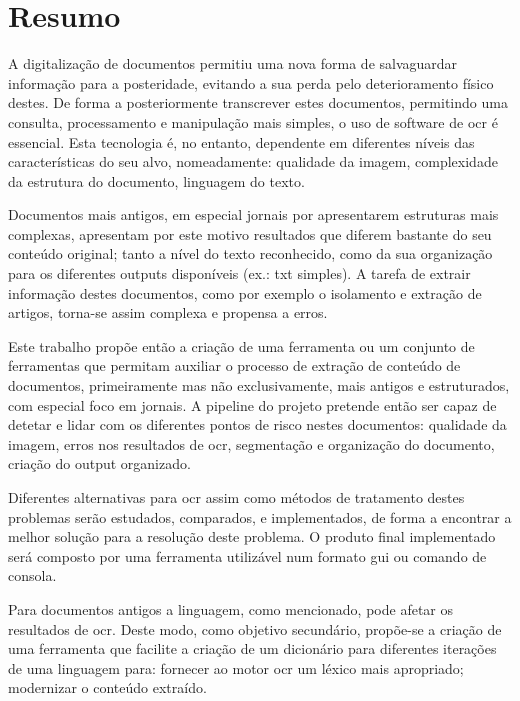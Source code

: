 \chapter*{Resumo}


A digitalização de documentos permitiu uma nova forma de salvaguardar informação para a posteridade, evitando a sua perda pelo deterioramento físico destes. De forma a posteriormente transcrever estes documentos, permitindo uma consulta, processamento e manipulação mais simples, o uso de software de \acrshort{ocr} é essencial. Esta tecnologia é, no entanto, dependente em diferentes níveis das características do seu alvo, nomeadamente: qualidade da imagem, complexidade da estrutura do documento, linguagem do texto. 

Documentos mais antigos, em especial jornais por apresentarem estruturas mais complexas, apresentam por este motivo resultados que diferem bastante do seu conteúdo original; tanto a nível do texto reconhecido, como da sua organização para os diferentes outputs disponíveis (ex.: txt simples). A tarefa de extrair informação destes documentos, como por exemplo o isolamento e extração de artigos, torna-se assim complexa e propensa a erros. 

Este trabalho propõe então a criação de uma ferramenta ou um conjunto de ferramentas que permitam auxiliar o processo de extração de conteúdo de documentos, primeiramente mas não exclusivamente, mais antigos e estruturados, com especial foco em jornais. A pipeline do projeto pretende então ser capaz de detetar e lidar com os diferentes pontos de risco nestes documentos: qualidade da imagem, erros nos resultados de \acrshort{ocr}, segmentação e organização do documento, criação do output organizado. 

Diferentes alternativas para \acrshort{ocr} assim como métodos de tratamento destes problemas serão estudados, comparados, e implementados, de forma a encontrar a melhor solução para a resolução deste problema. O produto final implementado será composto por uma ferramenta utilizável num formato \acrshort{gui} ou comando de consola. 

Para documentos antigos a linguagem, como mencionado, pode afetar os resultados de \acrshort{ocr}. Deste modo, como objetivo secundário, propõe-se a criação de uma ferramenta que facilite a criação de um dicionário para diferentes iterações de uma linguagem para: fornecer ao motor \acrshort{ocr} um léxico mais apropriado; modernizar o conteúdo extraído.

